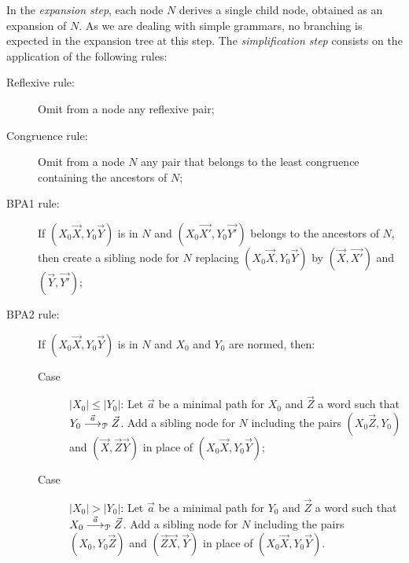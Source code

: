 In the \emph{expansion step}, each node $N$ derives a single child
node, obtained as an expansion of $N$. As we are dealing with simple
grammars, no branching is expected in the expansion tree at this
step.
%
The \emph{simplification step} consists on the application of the
following rules:
%
\begin{description}
\item[Reflexive rule:] Omit from a node any reflexive pair;
\item[Congruence rule:] Omit from a node $N$ any pair that belongs to
  the least congruence containing the ancestors of $N$;
\item[BPA1 rule:] If $(X_0 \vec X, Y_0 \vec Y)$ is in
  $N$ and $(X_0 \vec {X'}, Y_0 \vec {Y'})$ belongs to the ancestors of
  $N$, then create a sibling node for $N$ replacing
  $(X_0 \vec X, Y_0 \vec Y)$ by $(\vec X, \vec {X'})$ and
  $(\vec Y, \vec {Y'})$;
\item[BPA2 rule:] If $(X_0 \vec X, Y_0 \vec Y)$ is in $N$
  and $X_0$ and $Y_0$ are normed, then:
  \begin{description}
  \item[Case] $|X_0| \leq |Y_0|$: Let $\vec a$ be a minimal path
    for $X_0$ and $\vec Z$ a word such that
    $ Y_0 \LTSderivesP[\vec a] \vec Z$. Add a sibling node for
    $N$ including the pairs $(X_0 \vec Z, Y_0)$ and
    $(\vec X, \vec Z \vec Y)$ in place of $(X_0 \vec X, Y_0 \vec Y)$;
  \item[Case] $|X_0| > |Y_0|$: Let $\vec a$ be a minimal path for
    $Y_0$ and $\vec Z$ a word such that
    $ X_0 \LTSderivesP[\vec a] \vec Z$. Add a sibling node for $N$
    including the pairs $(X_0 , Y_0 \vec Z )$ and
    $(\vec Z\vec X, \vec Y)$ in place of $(X_0 \vec X, Y_0 \vec Y)$.
  \end{description}
\end{description}

